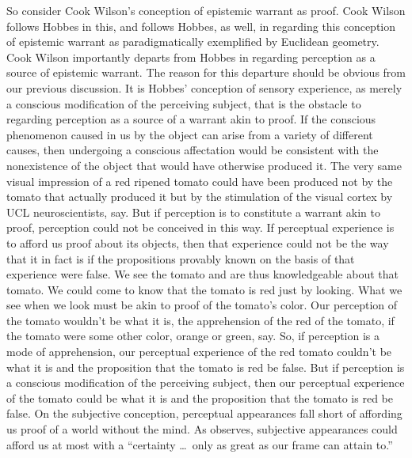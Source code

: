 \documentclass[12pt]{article}
\begin{document}
So consider Cook Wilson's conception of epistemic warrant as proof. Cook Wilson follows Hobbes in this, and follows Hobbes, as well, in regarding this conception of epistemic warrant as paradigmatically exemplified by Euclidean geometry. Cook Wilson importantly departs from Hobbes in regarding perception as a source of epistemic warrant. The reason for this departure should be obvious from our previous discussion. It is Hobbes' conception of sensory experience, as merely a conscious modification of the perceiving subject, that is the obstacle to regarding perception as a source of a warrant akin to proof. If the conscious phenomenon caused in us by the object can arise from a variety of different causes, then undergoing a conscious affectation would be consistent with the nonexistence of the object that would have otherwise produced it. The very same visual impression of a red ripened tomato could have been produced not by the tomato that actually produced it but by the stimulation of the visual cortex by UCL neuroscientists, say. But if perception is to constitute a warrant akin to proof, perception could not be conceived in this way. If perceptual experience is to afford us proof about its objects, then that experience could not be the way that it in fact is if the propositions provably known on the basis of that experience were false. We see the tomato and are thus knowledgeable about that tomato. We could come to know that the tomato is red just by looking. What we see when we look must be akin to proof of the tomato's color. Our perception of the tomato wouldn't be what it is, the apprehension of the red of the tomato, if the tomato were some other color, orange or green, say. So, if perception is a mode of apprehension, our perceptual experience of the red tomato couldn't be what it is and the proposition that the tomato is red be false. But if perception is a conscious modification of the perceiving subject, then our perceptual experience of the tomato could be what it is and the proposition that the tomato is red be false. On the subjective conception, perceptual appearances fall short of affording us proof of a world without the mind. As \citet{Locke:1706hc} observes, subjective appearances could afford us at most with a ``certainty \ldots\ only as great as our frame can attain to.''
\end{document}
